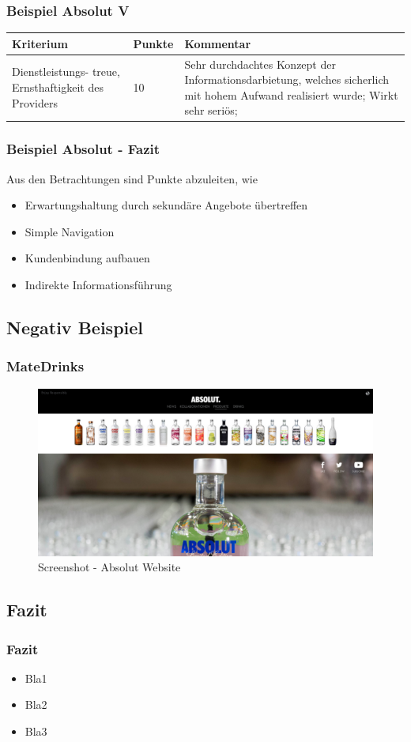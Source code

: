 \begin{frame}
	\frametitle{Beispiel Absolut V}
	\begin{tabular}{|p{}|l|p{6cm}|}
	\hline
	  Kriterium & Punkte & Kommentar \\ \hline
	  Dienstleistungs- treue, Ernsthaftigkeit des Providers & 10 & Sehr durchdachtes Konzept der Informationsdarbietung, welches sicherlich mit hohem Aufwand realisiert wurde; Wirkt sehr seriös; \\ \hline
 	\end{tabular}
\end{frame}

\begin{frame}\frametitle{Beispiel Absolut - Fazit}
	Aus den Betrachtungen sind Punkte abzuleiten, wie 
	\begin{itemize}
		\item Erwartungshaltung durch sekundäre Angebote übertreffen
		\item Simple Navigation
		\item Kundenbindung aufbauen
		\item Indirekte Informationsführung
	\end{itemize}
\end{frame}

\subsection{Negativ Beispiel}
\begin{frame}
	\frametitle{MateDrinks}
	\begin{figure}
	\includegraphics[scale=0.2]{bilder/absolut.png}
	\caption[Screenshot - Absolut Vodka]{Screenshot - Absolut Website}
	\label{labelname}
	\end{figure}
\end{frame}

\subsection{Fazit}
\begin{frame}
	\frametitle{Fazit}
	\begin{itemize}
		\item Bla1
		\item Bla2
		\item Bla3
	\end{itemize}
\end{frame}

